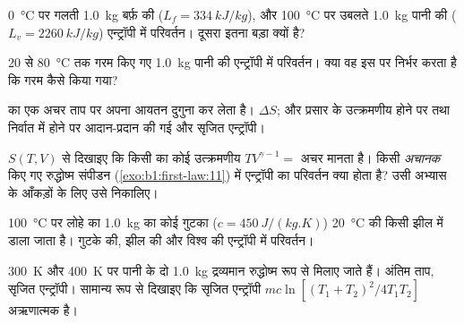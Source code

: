\begin{exercise}[$\star$]\label{exo:b1:second-law-entropy:1}
\qty{0}{\degreeCelsius} पर गलती \qty{1.0}{kg} बर्फ़ की
($L_f = \qty{334}{kJ/kg}$), और \qty{100}{\degreeCelsius} पर उबलते
\qty{1.0}{kg} पानी की ($L_v = \qty{2260}{kJ/kg}$) एन्ट्रॉपी में परिवर्तन।
दूसरा इतना बड़ा क्यों है?
\end{exercise}

\begin{exercise}[$\star$]\label{exo:b1:second-law-entropy:2}
\qty{20}{} से \qty{80}{\degreeCelsius} तक गरम किए गए \qty{1.0}{kg} पानी की
एन्ट्रॉपी में परिवर्तन। क्या वह इस पर निर्भर करता है कि गरम कैसे किया गया?
\end{exercise}

\begin{exercise}[$\star$]\label{exo:b1:second-law-entropy:3}
 का एक  अचर ताप पर अपना आयतन दुगुना कर लेता है।
$\Delta S$; और प्रसार के उत्क्रमणीय होने पर तथा निर्वात में  होने
पर आदान-प्रदान की गई और सृजित एन्ट्रॉपी।
\end{exercise}

\begin{exercise}[$\star$]\label{exo:b1:second-law-entropy:4}
$S(T, V)$ से दिखाइए कि किसी  का कोई उत्क्रमणीय 
$TV^{\gamma - 1} =$ अचर मानता है। किसी \emph{अचानक} किए गए रुद्धोष्म संपीडन
(\cref{exo:b1:first-law:11}) में एन्ट्रॉपी का परिवर्तन क्या होता है?
उसी अभ्यास के आँकड़ों के लिए उसे निकालिए।
\end{exercise}

\begin{exercise}[$\star\star$]\label{exo:b1:second-law-entropy:5}
\qty{100}{\degreeCelsius} पर लोहे का \qty{1.0}{kg} का कोई गुटका ($c = \qty{450}{J/(kg.K)}$)
\qty{20}{\degreeCelsius} की किसी झील में डाला जाता है। गुटके की, झील की और
विश्व की एन्ट्रॉपी में परिवर्तन।
\end{exercise}

\begin{exercise}[$\star\star$]\label{exo:b1:second-law-entropy:6}
\qty{300}{K} और \qty{400}{K} पर पानी के दो \qty{1.0}{kg} द्रव्यमान
रुद्धोष्म रूप से मिलाए जाते हैं। अंतिम ताप, सृजित एन्ट्रॉपी। सामान्य रूप
से दिखाइए कि सृजित एन्ट्रॉपी $mc\ln[(T_1 + T_2)^2/4T_1T_2]$ अऋणात्मक है।
\end{exercise}


